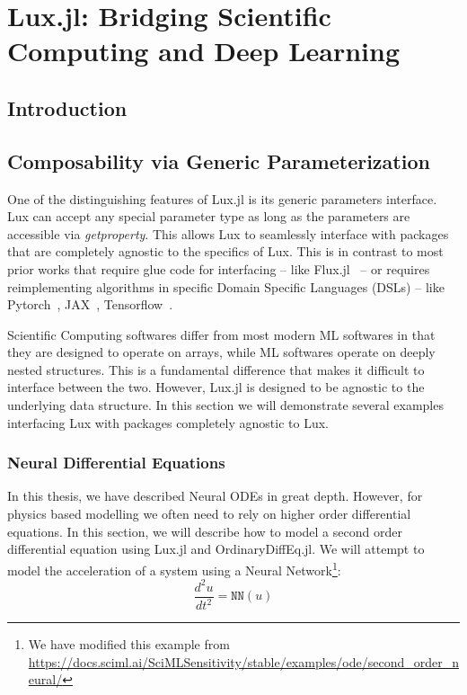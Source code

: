 \chapter{Lux.jl: Bridging Scientific Computing and Deep Learning}
\label{chapter:lux_bridging_scientific_computing_and_deep_learning}


\section{Introduction}
\label{sec:introduction_lux}

\section{Composability via Generic Parameterization}
\label{sec:composability}

One of the distinguishing features of Lux.jl is its generic parameters interface. Lux can accept any special parameter type as long as the parameters are accessible via \textit{getproperty}. This allows Lux to seamlessly interface with packages that are completely agnostic to the specifics of Lux. This is in contrast to most prior works that require glue code for interfacing -- like Flux.jl~\citep{innes:2018} -- or requires reimplementing algorithms in specific Domain Specific Languages (DSLs) -- like Pytorch~\citep{paszke2019pytorch,paszke2017automatic}, JAX~\citep{jax2018github}, Tensorflow~\citep{tensorflow2015-whitepaper}.

Scientific Computing softwares differ from most modern ML softwares in that they are designed to operate on arrays, while ML softwares operate on deeply nested structures. This is a fundamental difference that makes it difficult to interface between the two. However, Lux.jl is designed to be agnostic to the underlying data structure. In this section we will demonstrate several examples interfacing Lux with packages completely agnostic to Lux.

\subsection{Neural Differential Equations}
\label{subsec:differential_equations_lux}

In this thesis, we have described Neural ODEs in great depth. However, for physics based modelling we often need to rely on higher order differential equations. In this section, we will describe how to model a second order differential equation using Lux.jl and OrdinaryDiffEq.jl. We will attempt to model the acceleration of a system using a Neural Network\footnote{We have modified this example from \url{https://docs.sciml.ai/SciMLSensitivity/stable/examples/ode/second_order_neural/}}:
%
\begin{equation}
  \frac{d^2u}{dt^2} = \texttt{NN}(u)
\end{equation}
%

